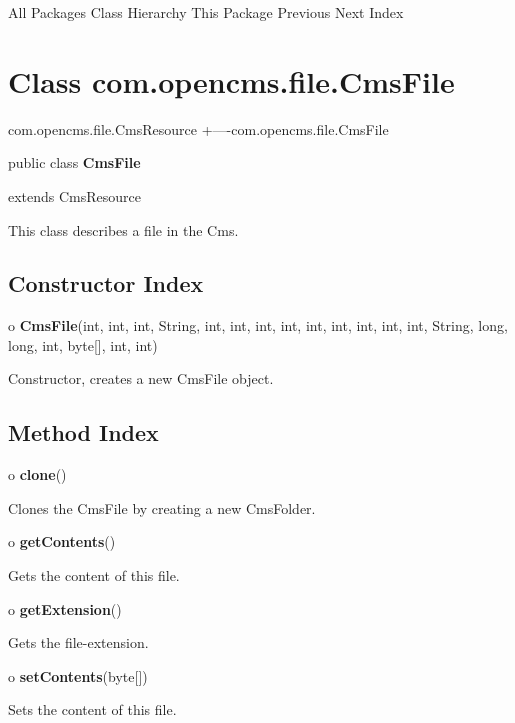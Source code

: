 \begin{PRE}
All Packages  Class Hierarchy  This Package  Previous  Next  Index
\end{PRE}

\htmlHR

\section{  Class com.opencms.file.CmsFile }

\begin{PRE}
com.opencms.file.CmsResource
   {\htmlBar}
   +----com.opencms.file.CmsFile
\end{PRE}

\htmlHR

\begin{description}
\item public class {\bf CmsFile}  
\item extends CmsResource 
\end{description}

This class describes a file in the Cms. 

\htmlHR

\subsection*{  Constructor Index }

\begin{description}
\item o {\bf CmsFile}(int, int, int, String, int, int, int, int, int, int,
int, int, int, String, long, long, int, byte[], int, int)  

Constructor, creates a new CmsFile object. 
\end{description}

\subsection*{  Method Index }

\begin{description}
\item o {\bf clone}()  

Clones the CmsFile by creating a new CmsFolder.  
\item o {\bf getContents}()  

Gets the content of this file.  
\item o {\bf getExtension}()  

Gets the file-extension.  
\item o {\bf setContents}(byte[])  

Sets the content of this file. 
\end{description}

